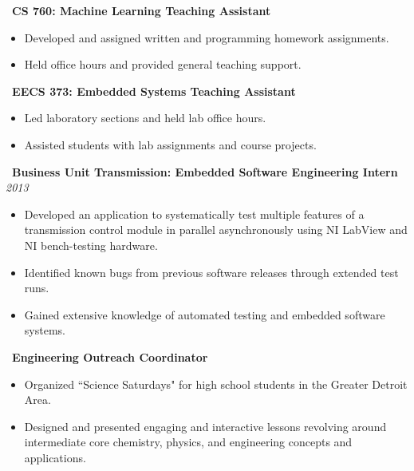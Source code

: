 \documentclass[]{article}
\begin{document}
 \newline
{\bf \ CS 760: Machine Learning Teaching Assistant}
\begin{itemize}[label={$\bullet$}]
	\item Developed and assigned written and programming homework assignments.
	\item Held office hours and provided general teaching support.
\end{itemize} 

 \newline
{\bf \ EECS 373: Embedded Systems Teaching Assistant}
\begin{itemize}[label={$\bullet$}]
	\item Led laboratory sections and held lab office hours.
	\item Assisted students with lab assignments and course projects.
\end{itemize}
\fi

 \newline
{\bf \ Business Unit Transmission: Embedded Software Engineering Intern} \hfill \textit{2013}
\begin{itemize}[label={$\bullet$}]
	\item Developed an application to systematically test multiple features of a transmission control module in parallel asynchronously using NI LabView and NI bench-testing hardware.
	\item Identified known bugs from previous software releases through extended test runs.
	\item Gained extensive knowledge of automated testing and embedded software systems.
\end{itemize}

\iffalse
{} \newline
{\bf \ Engineering Outreach Coordinator}
\begin{itemize}[label={$\bullet$}]
	\item Organized ``Science Saturdays" for high school students in the Greater Detroit Area.
	\item Designed and presented engaging and interactive lessons revolving around intermediate core chemistry, physics, and engineering concepts and applications.
\end{itemize}
\end{document}

